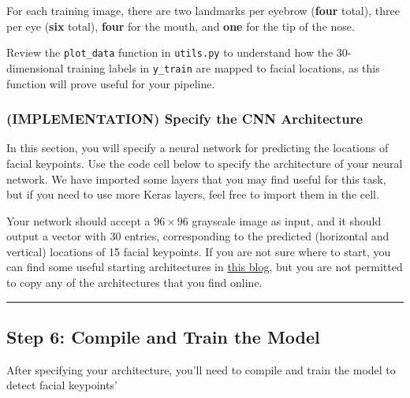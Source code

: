 \documentclass[11pt]{article}
\begin{document}
    For each training image, there are two landmarks per eyebrow
(\textbf{four} total), three per eye (\textbf{six} total), \textbf{four}
for the mouth, and \textbf{one} for the tip of the nose.

Review the \texttt{plot\_data} function in \texttt{utils.py} to
understand how the 30-dimensional training labels in \texttt{y\_train}
are mapped to facial locations, as this function will prove useful for
your pipeline.

    \hypertarget{implementation-specify-the-cnn-architecture}{%
\subsubsection{(IMPLEMENTATION) Specify the CNN
Architecture}\label{implementation-specify-the-cnn-architecture}}

In this section, you will specify a neural network for predicting the
locations of facial keypoints. Use the code cell below to specify the
architecture of your neural network. We have imported some layers that
you may find useful for this task, but if you need to use more Keras
layers, feel free to import them in the cell.

Your network should accept a \(96 \times 96\) grayscale image as input,
and it should output a vector with 30 entries, corresponding to the
predicted (horizontal and vertical) locations of 15 facial keypoints. If
you are not sure where to start, you can find some useful starting
architectures in
\href{http://danielnouri.org/notes/2014/12/17/using-convolutional-neural-nets-to-detect-facial-keypoints-tutorial/}{this
blog}, but you are not permitted to copy any of the architectures that
you find online.

    \begin{center}\rule{0.5\linewidth}{\linethickness}\end{center}

\hypertarget{step-6-compile-and-train-the-model}{%
\subsection{Step 6: Compile and Train the
Model}\label{step-6-compile-and-train-the-model}}

After specifying your architecture, you'll need to compile and train the
model to detect facial keypoints'
\end{document}
